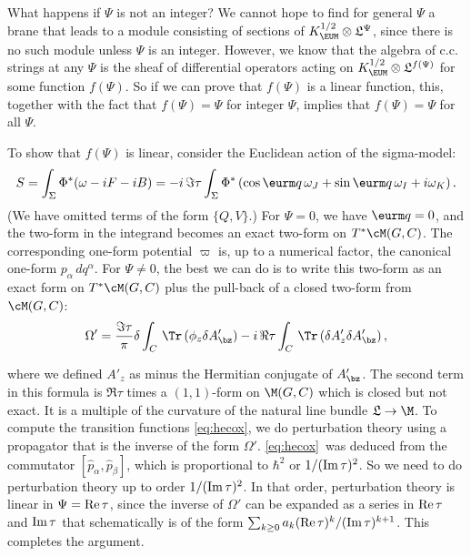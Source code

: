 What happens if $\Psi$ is not an integer?  We cannot hope to find
for general $\Psi$ a brane that leads to a module consisting of
sections of $K_{\EUM}^{1/2}\otimes {{{\frak L}}}^\Psi$, since
there is no such module unless $\Psi$ is an integer. However, we
know that the algebra of c.c. strings at any $\Psi$ is the sheaf
of differential operators acting on ${K_{\EUM}^{1/2}}\otimes
{\frak L}^{f(\Psi)}$ for some function $f(\Psi)$.  So if we can
prove that $f(\Psi)$ is a linear function, this, together with the
fact that $f(\Psi)=\Psi$ for integer $\Psi$, implies that
$f(\Psi)=\Psi$ for all $\Psi$.

To show that $f(\Psi)$ is linear, consider the Euclidean action of
the sigma-model: %
\setcounter{equation}{37}
\begin{equation}\label{eq:cumber}
S=\int_\Sigma\Phi^*
(\omega-iF-iB)=-i\,\Im\tau \int_\Sigma \Phi^*\left(\cos{\eurm q}\,
\omega_J+\sin{\eurm q}\, \omega_I + i\omega_K\right).
\end{equation}
 (We have
omitted terms of the form $\{Q,V\}$.)
 For $\Psi=0$, we have ${\eurm q}=0$, and the two-form in
the integrand becomes an exact two-form on $T^*\cM(G,C)$. The
corresponding one-form potential $\varpi$ is, up to a numerical
factor, the canonical one-form $p_\alpha\, dq^\alpha$.  For
$\Psi\neq 0$, the best we can do is to write this two-form as an
exact form on $T^*\cM(G,C)$ plus the pull-back of a closed
two-form from $\cM(G,C)$: %
\setcounter{equation}{38}
\begin{equation}\label{eq:hexo}
\Omega'={{\Im\tau}\over
\pi}\delta\int_C \,\Tr\left(\phi_z \delta A'_\bz\right)-
i\,\Re\tau \int_C\, \Tr\left(\delta A'_z\delta A'_\bz\right),
\end{equation}

where we defined $A'_z$ as minus the Hermitian conjugate of
$A'_\bz$. The second term in this formula is $\Re\tau$ times a
$(1,1)$-form  on $\M(G,C)$ which is closed but not exact.  It is a
multiple of the curvature of the natural line bundle ${\frak
L}\to\M$. To compute the transition functions \eqref{eq:hecox}, we do
perturbation theory using a propagator that is the inverse of the
form $\Omega'$. \eqref{eq:hecox}\ was deduced from the commutator $[\hat
p_\alpha,\hat p_\beta]$, which is proportional to $\hbar^2$ or
${1/ ({\rm Im}\,\tau)^2}$. So we need to do perturbation theory up
to order $1/({\rm Im}\,\tau)^2$. In that order, perturbation
theory is linear in $\Psi={\rm Re}\,\tau$, since the inverse of
$\Omega'$ can be expanded as a series in ${\rm Re}\,\tau$ and
${\rm Im}\,\tau$ that schematically is of the form $\sum_{k\geq
0}a_k({\rm Re}\,\tau)^k/({\rm Im}\,\tau)^{k+1}$. This completes
the argument.

